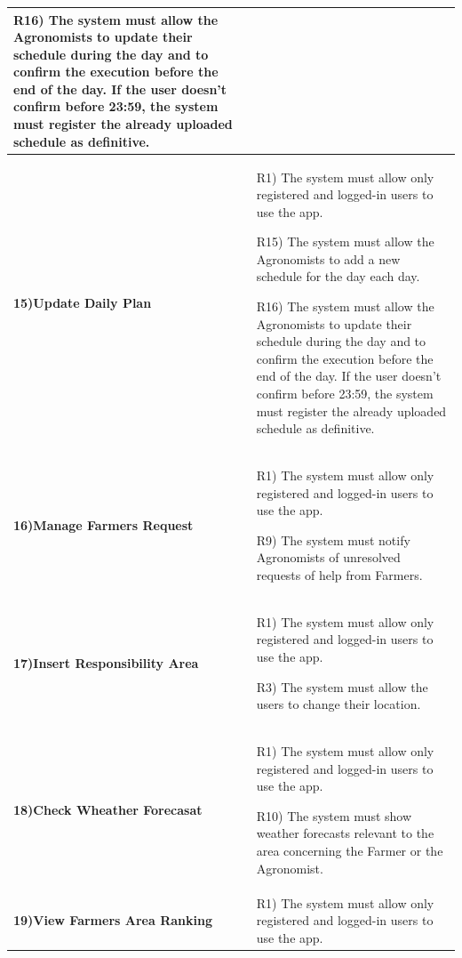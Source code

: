 \documentclass[table, 12pt]{article}
\begin{document}
\begin{itemize}
\begin{longtable}{|p{}|p{}|}
                                                                                          R16) The system must allow the Agronomists to update their schedule during the day and to confirm the execution before the end of the day. If the user doesn't confirm before 23:59, the system must register the already uploaded schedule as definitive.\\\hline
                    \cellcolor{SpringGreen!50}\textbf{15)Update Daily Plan}\centering &  R1) The system must allow only registered and logged-in users to use the app.
                    
                                                                                         R15) The system must allow the Agronomists to add a new schedule for the day each day.
                                                                                        
                                                                                         R16) The system must allow the Agronomists to update their schedule during the day and to confirm the execution before the end of the day. If the user doesn't confirm before 23:59, the system must register the already uploaded schedule as definitive.\\\hline
                    
                    \cellcolor{SpringGreen!50}\textbf{16)Manage Farmers Request}\centering &  R1) The system must allow only registered and logged-in users to use the app.
                    
                                                                                    R9) The system must notify Agronomists of unresolved requests of help from Farmers.\\\hline
                    \cellcolor{SpringGreen!50}\textbf{17)Insert Responsibility Area}\centering &  R1) The system must allow only registered and logged-in users to use the app.
                    
                                                                                        R3) The system must allow the users to change their location.\\\hline
                    \cellcolor{SpringGreen!50}\textbf{18)Check Wheather Forecasat}\centering & R1) The system must allow only registered and logged-in users to use the app.
                    
                                                                                     R10) The system must show weather forecasts relevant to the area concerning the Farmer or the Agronomist.\\\hline
                    \cellcolor{SpringGreen!50}\textbf{19)View Farmers Area Ranking}\centering&  R1) The system must allow only registered and logged-in users to use the app.


\end{longtable}
\end{itemize}
\end{document}
